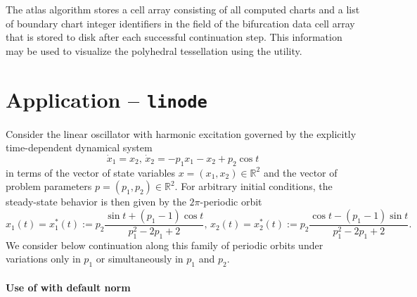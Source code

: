 The  atlas algorithm stores a cell array consisting of all computed charts and a list of boundary chart integer identifiers in the  field of the bifurcation data cell array that is stored to disk after each successful continuation step. This information may be used to visualize the polyhedral tessellation using the  utility.

\section{Application  -- \texttt{linode}}

Consider the linear oscillator with harmonic excitation governed by the explicitly time-dependent dynamical system
\begin{equation}
\dot{x}_1=x_2,\,\dot{x}_2=-p_1x_1-x_2+p_2\cos t
\end{equation}
in terms of the vector of state variables $x=\left(x_1,x_2\right)\in\mathbb{R}^2$ and the vector of problem parameters $p=\left(p_1,p_2\right)\in\mathbb{R}^2$. For arbitrary initial conditions, the steady-state behavior is then given by the $2\pi$-periodic orbit
\begin{equation}
x_1(t)=x_1^\ast(t):=p_2\frac{\sin t+(p_1-1)\cos t}{p_1^2-2p_1+2},\,x_2(t)=x_2^\ast(t):=p_2\frac{\cos t-(p_1-1)\sin t}{p_1^2-2p_1+2}.
\end{equation}
We consider below continuation along this family of periodic orbits under variations only in $p_1$ or simultaneously in $p_1$ and $p_2$. 


\paragraph{Use of  with default norm}

